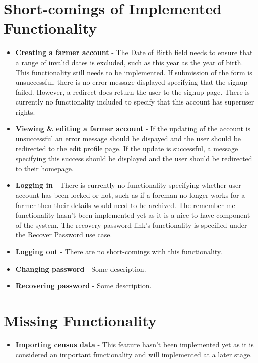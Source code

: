 \documentclass[11pt,fleqn]{book} %
\begin{document}
	\section{Short-comings of Implemented Functionality}
		\begin{itemize}
			\item\textbf{Creating a farmer account} -
			The Date of Birth field needs to ensure that a range of invalid dates is excluded, such as this year as the year of birth. This functionality still needs to be implemented. If submission of the form is unsuccessful, there is no error message displayed specifying that the signup failed. However, a redirect does return the user to the signup page. There is currently no functionality included to specify that this account has superuser rights.
			
			\item\textbf{Viewing \& editing a farmer account} - 
			If the updating of the account is unsuccessful an error message should be dispayed and the user should be redirected to the edit profile page. If the update is successful, a message specifying this success should be displayed and the user should be redirected to their homepage.
			
			\item\textbf{Logging in} -
			There is currently no functionality specifying whether user account has been locked or not, such as if a foreman no longer works for a farmer then their details would need to be archived. The remember me functionality hasn't been implemented yet as it is a nice-to-have component of the system. The recovery password link's functionality is specified under the Recover Password use case.
			
			\item\textbf{Logging out} -
			There are no short-comings with this functionality.
			
			\item\textbf{Changing password} -
			Some description.
			
			\item\textbf{Recovering password} -
			Some description.
		\end{itemize}
	\section{Missing Functionality}
		\begin{itemize}
			\item\textbf{Importing census data} -
			This feature hasn't been implemented yet as it is considered  an important functionality and will implemented at a later stage.
		\end{itemize}
\end{document}
